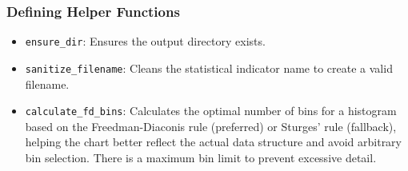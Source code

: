 \documentclass[12pt, a4paper]{report}
\begin{document}
\subsubsection*{Defining Helper Functions}
\begin{itemize}
    \item \texttt{ensure\_dir}: Ensures the output directory exists.
    \item \texttt{sanitize\_filename}: Cleans the statistical indicator name to create a valid filename.
    \item \texttt{calculate\_fd\_bins}: Calculates the optimal number of bins for a histogram based on the Freedman-Diaconis rule (preferred) or Sturges' rule (fallback), helping the chart better reflect the actual data structure and avoid arbitrary bin selection. There is a maximum bin limit to prevent excessive detail.
\end{itemize}
\end{document}
